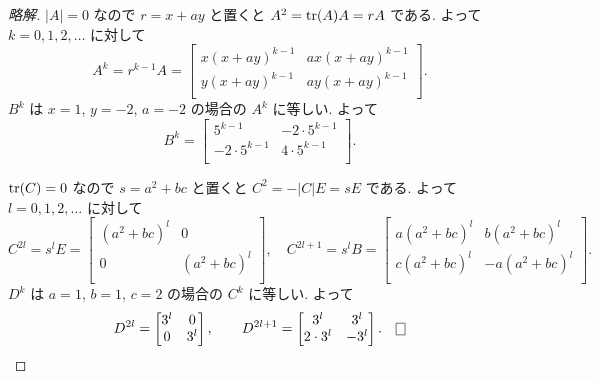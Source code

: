 \documentclass[12pt,twoside]{jarticle}
\newcommand\commentout[1]{#1}
\newcommand\commentout[1]{}
\begin{document}
\commentout{
\begin{proof}[略解]
  $|A|=0$ なので $r = x+ay$ と置くと $A^2 = \mathop{\mathrm{tr}}\nolimits(A)A = rA$ である.
  よって $k=0,1,2,\ldots$ に対して
  \begin{equation*}
    A^k = r^{k-1}A = 
    \begin{bmatrix}
      x(x+ay)^{k-1} & ax(x+ay)^{k-1} \\
      y(x+ay)^{k-1} & ay(x+ay)^{k-1} \\
    \end{bmatrix}.
  \end{equation*}
  $B^k$ は $x=1$, $y=-2$, $a=-2$ の場合の $A^k$ に等しい. よって
  \begin{equation*}
    B^k =
    \begin{bmatrix}
              5^{k-1} & -2\cdot 5^{k-1} \\
      -2\cdot 5^{k-1} &  4\cdot 5^{k-1} \\
    \end{bmatrix}.
  \end{equation*}

  $\mathop{\mathrm{tr}}\nolimits(C)=0$ なので $s = a^2+bc$ と置くと $C^2 = -|C|E=sE$ である. 
  よって $l=0,1,2,\ldots$ に対して
  {\small\begin{equation*}
    C^{2l} = s^l E = 
    \begin{bmatrix}
      (a^2+bc)^l & 0 \\
      0 & (a^2+bc)^l \\
    \end{bmatrix},
    \quad
    C^{2l+1} = s^l B = 
    \begin{bmatrix}
      a(a^2+bc)^l &  b(a^2+bc)^l \\
      c(a^2+bc)^l & -a(a^2+bc)^l \\
    \end{bmatrix}.
  \end{equation*}}
  $D^k$ は $a=1$, $b=1$, $c=2$ の場合の $C^k$ に等しい. よって
  \begin{equation*}
    D^{2l} =
    \begin{bmatrix}
      3^l & 0 \\
      0 & 3^l \\
    \end{bmatrix},
    \qquad
    D^{2l+1} =
    \begin{bmatrix}
             3^l &  3^l \\
      2\cdot 3^l & -3^l \\
    \end{bmatrix}.
    \qed
  \end{equation*}
\end{proof}
}
\end{document}
